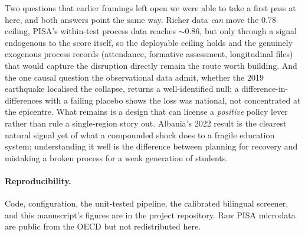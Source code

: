 Two questions that earlier framings left open we were able to take a first pass at here,
and both answers point the same way. Richer data \emph{can} move the 0.78 ceiling,
PISA's within-test process data reaches $\sim$0.86, but only through a signal endogenous
to the score itself, so the deployable ceiling holds and the genuinely exogenous process
records (attendance, formative assessment, longitudinal files) that would capture the
disruption directly remain the route worth building. And the one causal question the
observational data admit, whether the 2019 earthquake localised the collapse, returns a
well-identified null: a difference-in-differences with a failing placebo shows the loss
was national, not concentrated at the epicentre. What remains is a design that can
license a \emph{positive} policy lever rather than rule a single-region story out. Albania's 2022 result is the clearest natural signal yet of what
a compounded shock does to a fragile education system; understanding it well is the
difference between planning for recovery and mistaking a broken process for a weak
generation of students.

\paragraph{Reproducibility.}
Code, configuration, the unit-tested pipeline, the calibrated bilingual screener, and
this manuscript's figures are in the project repository. Raw PISA microdata are public
from the OECD but not redistributed here.

